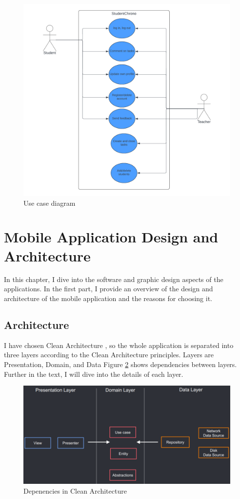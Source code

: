 \documentclass[
  biblatex = false,
  language=english,
  figures=false,
  sourcecodes,
  glossaries,
  index
]{kidiplom}
\begin{document}
\begin{figure}[h]
\centering
\includegraphics[width=15cm]{image3}
\caption{Use case diagram}
\label{fig:image3}
\end{figure}

\section{Mobile Application Design and Architecture}
In this chapter, I dive into the software and graphic design aspects of the applications. In the first part, I provide an overview of the design and architecture of the mobile application and the reasons for choosing it.
\subsection{Architecture}
I have chosen Clean Architecture \cite{bib7}, so the whole application is separated into three layers according to the Clean Architecture principles. Layers are Presentation, Domain, and Data Figure \ref{fig:image4} shows dependencies between layers. Further in the text, I will dive into the details of each layer.

\begin{figure}[h]
\centering
\includegraphics[width=15cm]{image4}
\caption{Depenencies in Clean Architecture}
\label{fig:image4}
\end{figure}
\end{document}
